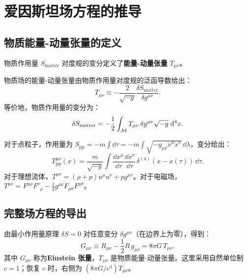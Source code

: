 \section{爱因斯坦场方程的推导}
\label{sec:EFE_derivation}

\subsection{物质能量-动量张量的定义}

物质作用量 $S_{\text{matter}}$ 对度规的变分定义了\textbf{能量-动量张量} $T_{\mu\nu}$。

\begin{definition}
物质场的能量-动量张量由物质作用量对度规的泛函导数给出：
\begin{equation}
    \boxed{T_{\mu\nu} \equiv -\frac{2}{\sqrt{-g}} \frac{\delta S_{\text{matter}}}{\delta g^{\mu\nu}}}.
    \label{eq:EMT_definition}
\end{equation}
等价地，物质作用量的变分为：
\begin{equation}
    \delta S_{\text{matter}} = -\frac{1}{2} \int_{\mathcal{M}} T_{\mu\nu} \, \delta g^{\mu\nu} \sqrt{-g} \; \dd^4 x.
    \label{eq:Smatter_variation}
\end{equation}
\end{definition}

\begin{note}[与经典定义的对应]
对于点粒子，作用量为 $S_{\text{pp}} = -m\int \dd\tau = -m\int\sqrt{-g_{\mu\nu}\dot x^\mu \dot x^\nu}\,\dd\lambda$，变分给出：
\begin{equation}
    T^{\mu\nu}_{\text{pp}}(x) = \frac{m}{\sqrt{-g}} \int \frac{\dd x^\mu}{\dd\tau}\frac{\dd x^\nu}{\dd\tau} \, \delta^{(4)}(x - x(\tau)) \,\dd\tau.
\end{equation}
对于理想流体，$T^{\mu\nu} = (\rho + p)u^\mu u^\nu + p g^{\mu\nu}$。对于电磁场，$T^{\mu\nu} = F^{\mu\rho}F^\nu{}_\rho - \frac{1}{4}g^{\mu\nu}F_{\rho\sigma}F^{\rho\sigma}$。
\end{note}

\subsection{完整场方程的导出}

\begin{theorem}[爱因斯坦场方程]
由最小作用量原理 $\delta S = 0$ 对任意变分 $\delta g^{\mu\nu}$（在边界上为零），得到：
\begin{equation}
    \boxed{G_{\mu\nu} \equiv R_{\mu\nu} - \frac{1}{2} R \, g_{\mu\nu} = 8\pi G \, T_{\mu\nu}}.
    \label{eq:Einstein_equation}
\end{equation}
其中 $G_{\mu\nu}$ 称为\textbf{Einstein 张量}，$T_{\mu\nu}$ 是物质能量-动量张量。这里采用自然单位制 $c = 1$；恢复 $c$ 时，右侧为 $(8\pi G/c^4)T_{\mu\nu}$。
\end{theorem}

